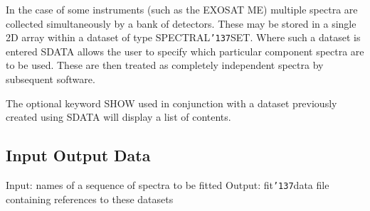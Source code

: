 \documentclass{book}
\renewcommand{\_}{{\tt\char'137}}     %
\begin{document}
In the case of some instruments (such as the EXOSAT ME) multiple
spectra are collected simultaneously by a bank of detectors.
These may be stored in a single 2D array within a dataset of type
SPECTRAL\_SET. Where such a dataset is entered SDATA allows the
user to specify which particular component spectra are to be
used. These are then treated as completely independent spectra by
subsequent software.
 
The optional keyword SHOW used in conjunction with a dataset
previously created using SDATA will display a list of contents.
 
\subsection{Input Output Data}
Input: names of a sequence of spectra to be fitted
Output: fit\_data file containing references to these datasets
\end{document}
